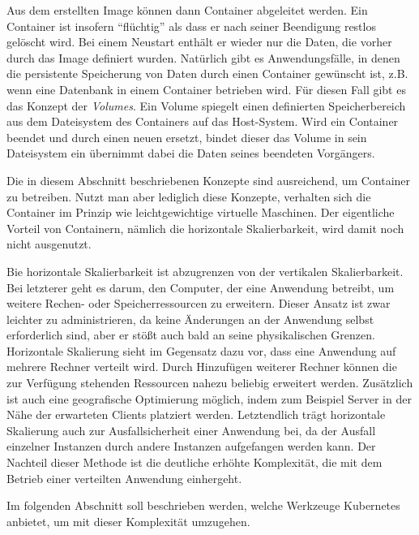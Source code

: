 \documentclass[11pt,a4paper]{article}
\begin{document}
Aus dem erstellten Image können dann Container abgeleitet werden. Ein Container ist insofern ``flüchtig'' als dass er nach seiner
Beendigung restlos gelöscht wird. Bei einem Neustart enthält er wieder nur die Daten, die vorher durch das Image definiert wurden.
Natürlich gibt es Anwendungsfälle, in denen die persistente Speicherung von Daten durch einen Container gewünscht ist, z.B. wenn
eine Datenbank in einem Container betrieben wird. Für diesen Fall gibt es das Konzept der \emph{Volumes}.
Ein Volume spiegelt einen definierten Speicherbereich aus dem Dateisystem des Containers auf das Host-System. 
Wird ein Container beendet und durch einen neuen ersetzt, bindet dieser das Volume in sein Dateisystem ein übernimmt dabei die Daten seines beendeten Vorgängers.

Die in diesem Abschnitt beschriebenen Konzepte sind ausreichend, um Container zu betreiben.
Nutzt man aber lediglich diese Konzepte, verhalten sich die Container im Prinzip wie leichtgewichtige virtuelle Maschinen.
Der eigentliche Vorteil von Containern, nämlich die horizontale Skalierbarkeit, wird damit noch nicht ausgenutzt.

Bie horizontale Skalierbarkeit ist abzugrenzen von der vertikalen Skalierbarkeit. Bei letzterer geht es darum, den Computer, der eine Anwendung betreibt,
um weitere Rechen- oder Speicherressourcen zu erweitern. Dieser Ansatz ist zwar leichter zu administrieren, da keine Änderungen an der Anwendung selbst
erforderlich sind, aber er stößt auch bald an seine physikalischen Grenzen. Horizontale Skalierung sieht im Gegensatz dazu vor, dass eine Anwendung
auf mehrere Rechner verteilt wird. Durch Hinzufügen weiterer Rechner können die zur Verfügung stehenden Ressourcen nahezu beliebig erweitert werden.
Zusätzlich ist auch eine geografische Optimierung möglich, indem zum Beispiel Server in der Nähe der erwarteten Clients platziert werden. 
Letztendlich trägt horizontale Skalierung auch zur Ausfallsicherheit einer Anwendung bei, da der Ausfall einzelner Instanzen durch andere Instanzen
aufgefangen werden kann.
Der Nachteil dieser Methode ist die deutliche erhöhte Komplexität, die mit dem Betrieb einer verteilten Anwendung einhergeht.

Im folgenden Abschnitt soll beschrieben werden, welche Werkzeuge Kubernetes anbietet, um mit dieser Komplexität umzugehen.
\end{document}
